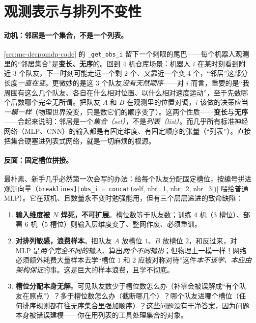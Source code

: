\section{观测表示与排列不变性}
\label{sec:mc-perminv}

\paragraph{动机：邻居是一个集合，不是一个列表。}
\cref{sec:mc-decpomdp-code} 的 \verb|_get_obs_i| 留下一个刺眼的尾巴——每个机器人观测里的“邻居集合”是\textbf{变长、无序}的。回到 $4$ 机仓库场景：机器人 $i$ 在某时刻看到附近 $3$ 个队友，下一时刻可能走远一个剩 $2$ 个、又靠近一个变 $4$ 个，“邻居”这部分长度\emph{一直在变}。更微妙的是这 $3$ 个队友\emph{没有天然顺序}——对 $i$ 而言，重要的是“我周围有这么几个队友、各自在什么相对位置、以什么相对速度运动”，至于先数哪个后数哪个完全无所谓。把队友 $A$ 和 $B$ 在观测里的位置对调，$i$ 该做的决策应当\emph{一模一样}（物理世界没变，只是数它们的顺序变了）。这两个性质——\textbf{变长}与\textbf{无序}——合起来说明：邻居是一个\emph{集合（set）}，不是\emph{列表（list）}。而几乎所有标准神经网络（MLP、CNN）的输入都是有固定维度、有固定顺序的张量（“列表”）。直接把集合硬塞进列表式网络，就是一切麻烦的根源。

\paragraph{反面：固定槽位拼接。}
最朴素、新手几乎必然第一次会写的办法：给每个队友分配固定槽位，按编号拼进观测向量（\Verb[breaklines]|obs_i = concat([self, nbr_1, nbr_2, nbr_3])| 喂给普通 MLP）。它在双机、且数量永不变时勉强能用，但有三个层层递进的致命缺陷：

\begin{enumerate}
  \item \textbf{输入维度被 $N$ 焊死，不可扩展}。槽位数等于队友数；训练 $4$ 机（$3$ 槽位）、部署 $6$ 机（$5$ 槽位）则输入层维度变了、整网作废、必须重训。
  \item \textbf{对排列敏感，浪费样本}。把队友 $A$ 放槽位 $1$、$B$ 放槽位 $2$，和反过来，对 MLP 是\emph{两个完全不同的输入}、算出\emph{两个不同输出}；但物理上一模一样！网络必须额外耗费大量样本去学“槽位 $1$ 和 $2$ 应被对称对待”这件\emph{本不该学、本应由架构保证}的事。这是巨大的样本浪费，且学不彻底。
  \item \textbf{槽位分配本身无解}。可见队友数少于槽位数怎么办（补零会被误解成“有个队友在原点”）？多于槽位数怎么办（截断哪几个）？哪个队友进哪个槽位（任何排序规则都在往无序集合里强加顺序）？这些问题没有干净答案，因为问题本身被错误建模——你在用列表的工具处理集合的对象。
\end{enumerate}

